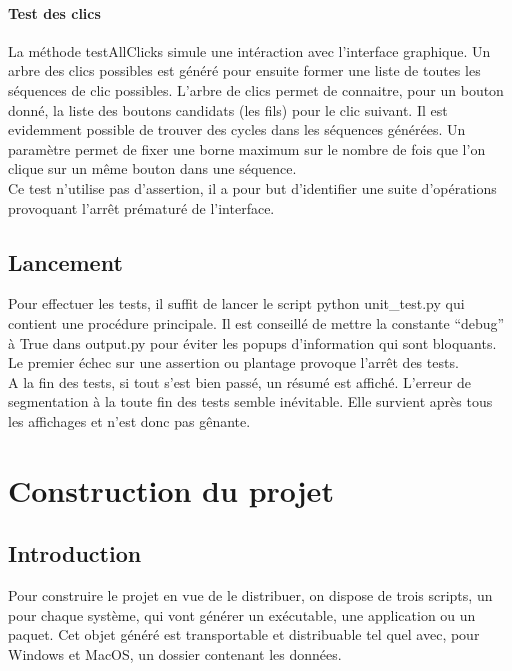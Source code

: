 \documentclass[12pt,a4paper]{article}
\begin{document}
    \paragraph{Test des clics}
    La méthode testAllClicks simule une intéraction avec l'interface graphique.
    Un arbre des clics possibles est généré pour ensuite former une liste de
    toutes les séquences de clic possibles. L'arbre de clics permet de
    connaitre, pour un bouton donné, la liste des boutons candidats (les fils)
    pour le clic suivant. Il est evidemment possible de trouver des cycles dans
    les séquences générées. Un paramètre permet de fixer une borne maximum sur
    le nombre de fois que l'on clique sur un même bouton dans une séquence. \\

    Ce test n'utilise pas d'assertion, il a pour but d'identifier une suite
    d'opérations provoquant l'arrêt prématuré de l'interface.

    \subsection{Lancement}
    Pour effectuer les tests, il suffit de lancer le script python unit\_test.py
    qui contient une procédure principale. Il est conseillé de mettre la
    constante ``debug'' à True dans output.py pour éviter les popups
    d'information qui sont bloquants.\\

    Le premier échec sur une assertion ou plantage provoque l'arrêt des tests.\\

    A la fin des tests, si tout s'est bien passé, un résumé est affiché.
    L'erreur de segmentation à la toute fin des tests semble inévitable. Elle
    survient après tous les affichages et n'est donc pas gênante.


\section{Construction du projet}

    \subsection{Introduction}
    Pour construire le projet en vue de le distribuer, on dispose de trois
    scripts, un pour chaque système, qui vont générer un exécutable, une
    application ou un paquet. Cet objet généré est transportable et distribuable
    tel quel avec, pour Windows et MacOS, un dossier contenant les données.\\
\end{document}

